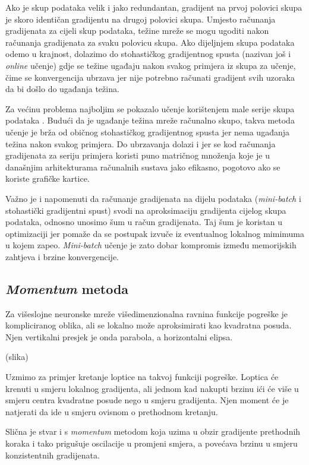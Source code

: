 \documentclass[times, utf8, diplomski, numeric]{fer}
\begin{document}
Ako je skup podataka velik i jako redundantan, gradijent na prvoj polovici skupa je skoro identičan gradijentu na drugoj polovici skupa. Umjesto računanja gradijenata za cijeli skup podataka, težine mreže se mogu ugoditi nakon računanja gradijenata za svaku polovicu skupa. Ako dijeljnjem skupa podataka odemo u krajnost, dolazimo do stohastičkog gradijentnog spusta (nazivan još i \emph{online} učenje) gdje se težine ugađaju nakon svakog primjera iz skupa za učenje, čime se konvergencija ubrzava jer nije potrebno računati gradijent svih uzoraka da bi došlo do ugađanja težina.

Za većinu problema najboljim se pokazalo učenje korištenjem male serije skupa podataka . Budući da je ugađanje težina mreže računalno skupo, takva metoda učenje je brža od običnog stohastičkog gradijentnog spusta jer nema ugađanja težina nakon svakog primjera. Do ubrzavanja dolazi i jer se kod računanja gradijenata za seriju primjera koristi puno matričnog množenja koje je u današnjim arhitekturama računalnih sustava jako efikasno, pogotovo ako se koriste grafičke kartice.

Važno je i napomenuti da računanje gradijenata na dijelu podataka (\textit{mini-batch} i stohastički gradijentni spust) svodi na aproksimaciju gradijenta cijelog skupa podataka, odnosno unosimo šum u račun gradijenata.
Taj šum je koristan u optimizaciji jer pomaže da se postupak izvuče iz eventualnog lokalnog mimimuma u kojem zapeo. \textit{Mini-batch} učenje je zato dobar kompromis između memorijskih zahtjeva i brzine konvergencije.


\subsection{\emph{Momentum} metoda}

Za višeslojne neuronske mreže višedimenzionalna ravnina funkcije pogreške je kompliciranog oblika, ali se lokalno može aproksimirati kao kvadratna posuda. Njen vertikalni presjek je onda parabola, a horizontalni elipsa.

(slika)

Uzmimo za primjer kretanje loptice na takvoj funkciji pogreške. Loptica će krenuti u smjeru lokalnog gradijenta, ali jednom kad nakupti brzinu ići će više u smjeru centra kvadratne posude nego u smjeru gradijenta. Njen moment će je natjerati da ide u smjeru ovisnom o prethodnom kretanju.

Slična je stvar i s \emph{momentum} metodom koja uzima u obzir gradijente prethodnih koraka i tako prigušuje oscilacije u promjeni smjera, a povećava brzinu u smjeru konzistentnih gradijenata.
\end{document}
